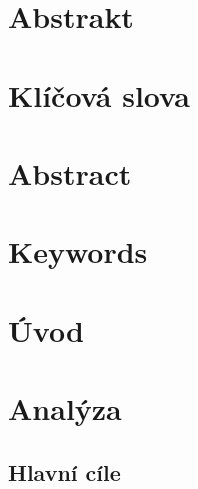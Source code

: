\documentclass[a4paper,11pt,titlepage,fleqn]{article}
\begin{document}


\setcounter{page}{3}

\newpage
\thispagestyle{plain}
\section*{Abstrakt}

\section*{Klíčová slova}

\thispagestyle{empty}
\newpage

\section*{Abstract}

\section*{Keywords}

\thispagestyle{empty}

\newpage
\tableofcontents

\newpage
\listoffigures
\listoftables
\lstlistoflistings
\newpage
\printglossary[type=\acronymtype,title=Seznam zkratek]
\cleardoublepage


\section{Úvod}


\newpage
\section{Analýza}

    \subsection{Hlavní cíle}
\end{document}
